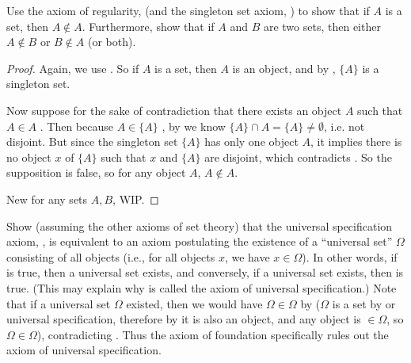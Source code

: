 \begin{exercise} \label{exercise 3.2.2}
Use the axiom of regularity,  (and the singleton set axiom, ) to show that if \(A\) is a set, then \(A \notin A\). Furthermore, show that if \(A\) and \(B\) are two sets, then either \(A \notin B\) or \(B \notin A\) (or both).
\end{exercise}

\begin{proof}
Again, we use . So if \(A\) is a set, then \(A\) is an object, and by , \(\{A\}\) is a singleton set.

Now suppose for the sake of contradiction that there exists an object \(A\) such that \(A \in A\) . Then because \(A \in \{A\} \)  , by  we know \(\{A\} \cap A = \{A\} \neq \emptyset\), i.e. not disjoint. But since the singleton set \( \{A\} \) has only one object \(A\), it implies there is no object \(x\) of \(\{A\}\) such that \(x\) and \( \{A\}\) are disjoint, which contradicts . So the supposition is false, so for any object \(A\), \(A \notin A\).

New for any sets \(A, B\), WIP.
\end{proof}

\begin{exercise} \label{exercise 3.2.3}
Show (assuming the other axioms of set theory) that the universal specification axiom, , is equivalent to an axiom postulating the existence of a ``universal set'' \(\Omega\) consisting of all objects (i.e., for all objects \(x\), we have \(x \in \Omega\)). In other words, if  is true, then a universal set exists, and conversely, if a universal set exists, then  is true. (This may explain why  is called the axiom of universal specification.) Note that if a universal set \(\Omega\) existed, then we would have \(\Omega \in \Omega\) by  (\(\Omega\) is a set by  or universal specification, therefore by  it is also an object, and any object is \(\in \Omega\), so \(\Omega \in \Omega\)), contradicting . Thus the axiom of foundation specifically rules out the axiom of universal specification.
\end{exercise}

